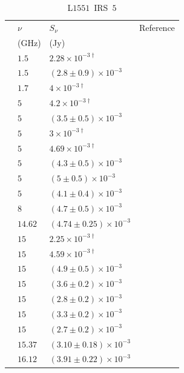\documentclass[9pt]{extarticle}   	%
\begin{document}
\begin{table}
\caption{L$1551$~IRS~$5$}
\begin{center}
\begin{tabular}{llll}
\hline
 & $\nu$ & $S_\nu$ & Reference\\
 & (GHz) & (Jy) & \\
\hline
 & $1.5$ & $2.28\times10^{-3\dag}$ & \citet{1985ApJ...289L...5B}\\
 & $1.5$ & $(2.8\pm0.9)\times10^{-3}$ & \citet{1985ApJ...290..587S}\\
 & $1.7$ & $4\times10^{-3\dag}$ & \citet{1989ApJ...337..712R}\\
 & $5$ & $4.2\times10^{-3\dag}$ & \citet{1987MNRAS.224..721D}\\
 & $5$ & $(3.5\pm0.5)\times10^{-3}$ & \citet{1982ApJ...253..707C}\\
 & $5$ & $3\times10^{-3\dag}$ & \citet{1984ApJ...282..699B}\\
 & $5$ & $4.69\times10^{-3\dag}$ & \citet{1985ApJ...289L...5B}\\
 & $5$ & $(4.3\pm0.5)\times10^{-3}$ & \citet{1985ApJ...290..587S}\\
 & $5$ & $(5\pm0.5)\times10^{-3}$ & \citet{1987ApJ...320..364E}\\
 & $5$ & $(4.1\pm0.4)\times10^{-3}$ & \citet{1990ApJ...355..635K}\\
 & $8$ & $(4.7\pm0.5)\times10^{-3}$ & \citet{1990ApJ...355..635K}\\
 & $14.62$ & $(4.74\pm0.25)\times10^{-3}$ & \citet{2012MNRAS.423.1089A}\\
 & $15$ & $2.25\times10^{-3\dag}$ & \citet{1986ApJ...301L..25R}\\
 & $15$ & $4.59\times10^{-3\dag}$ & \citet{1985ApJ...289L...5B}\\
 & $15$ & $(4.9\pm0.5)\times10^{-3}$ & \citet{1990ApJ...355..635K}\\
 & $15$ & $(3.6\pm0.2)\times10^{-3}$ & \citet{2003ApJ...583..330R}\\
 & $15$ & $(2.8\pm0.2)\times10^{-3}$ & \citet{2003ApJ...583..330R}\\
 & $15$ & $(3.3\pm0.2)\times10^{-3}$ & \citet{2003ApJ...583..330R}\\
 & $15$ & $(2.7\pm0.2)\times10^{-3}$ & \citet{2003ApJ...583..330R}\\
 & $15.37$ & $(3.10\pm0.18)\times10^{-3}$ & \citet{2012MNRAS.423.1089A}\\
 & $16.12$ & $(3.91\pm0.22)\times10^{-3}$ & \citet{2012MNRAS.423.1089A}\\

\end{tabular}
\end{center}
\end{table}
\end{document}
